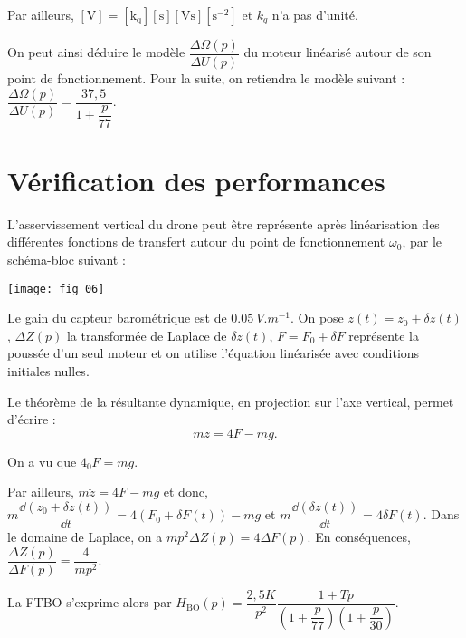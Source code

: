 \begin{multicols}{2}
\begin{corrige}
Par ailleurs, $[\text{V}]=[\text{k}_{\text{q}}][\text{s}][\text{Vs}][\text{s}^{-2}]$  et $k_q$ n'a pas d'unité. 

\end{corrige}
\else
\fi

On peut ainsi déduire le modèle $\dfrac{\Delta \Omega(p)}{\Delta U(p)}$ du moteur linéarisé autour de son point de fonctionnement. Pour la suite, on retiendra le modèle suivant : $\dfrac{\Delta \Omega(p)}{\Delta U(p)}=\dfrac{37,5}{1+\dfrac{p}{77}}$.

\section*{Vérification des performances}

\ifprof
\else
L'asservissement vertical du drone peut être représente après linéarisation des différentes fonctions de
transfert autour du point de fonctionnement $\omega_0$, par le schéma-bloc suivant :

\begin{center}
\texttt{[image: fig\_06]}
\end{center}



Le gain du capteur barométrique est de $\SI{0,05}{V.m^{-1}}$. On pose $z(t)=z_0+\delta z(t)$, $\Delta Z(p)$ la transformée de Laplace de $\delta z(t)$, $F=F_0 + \delta F$ représente la poussée d'un seul moteur et on utilise l'équation linéarisée avec conditions initiales nulles.

Le théorème de la résultante dynamique, en projection sur l’axe vertical, permet d’écrire :
$$ m\ddot{z} =4F-mg. $$
\fi



\ifprof
\begin{corrige}
On a vu que  $4 _0F = mg$. 

Par ailleurs, $ m\ddot{z} =4F-mg $ et donc, $ m\dfrac{ \dd\left( z_0+\delta z(t) \right)}{\dd t} = 4\left( F_0 + \delta F(t) \right)-mg$ et
 $ m\dfrac{ \dd\left( \delta z(t) \right)}{\dd t} = 4 \delta F(t) $. Dans le domaine de Laplace, on a 
  $ m p^2  \Delta Z(p) = 4 \Delta F(p) $. En conséquences,  
   $\dfrac{\Delta Z(p)}{\Delta F(p)} = \dfrac{4}{mp^2}$.
   
La FTBO s'exprime alors par $H_{\text{BO}}(p)=\dfrac{2,5 K}{p^2}\dfrac{1+Tp}{\left( 1+\dfrac{p}{77}\right)\left(1+\dfrac{p}{30} \right)}$.
\end{corrige}
\else
\fi


\end{multicols}
